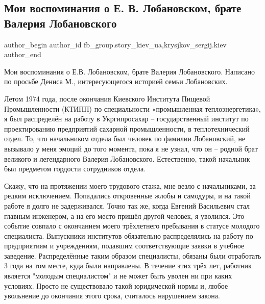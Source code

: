  
 
 
 
 
 
\subsection{Мои воспоминания о Е. В. Лобановском, брате Валерия Лобановского}
\label{sec:03_01_2022.fb.fb_group.story_kiev_ua.1.ev_lobanovskij}
 
\ifcmt
 author_begin
   author_id fb_group.story_kiev_ua,krysjkov_sergij.kiev
 author_end
\fi

Мои воспоминания о Е.В. Лобановском, брате Валерия Лобановского. Написано по
просьбе Дениса М., интересующегося историей семьи Лобановских.

Летом 1974 года, после окончания Киевского Института Пищевой Промышленности
(КТИПП) по специальности «промышленная теплоэнергетика», я был распределён на
работу в Укргипросахар – государственный институт по проектированию предприятий
сахарной промышленности, в теплотехнический отдел. То, что начальником отдела
был человек по фамилии Лобановский, не вызывало у меня эмоций до того момента,
пока я не узнал, что он – родной брат великого и легендарного Валерия
Лобановского. Естественно, такой начальник был предметом гордости сотрудников
отдела.


Скажу, что на протяжении моего трудового стажа, мне везло с начальниками, за
редким исключением. Попадались откровенные жлобы и самодуры, и на такой работе
я долго не задерживался. Точно так же, когда Евгений Васильевич стал главным
инженером, а на его место пришёл другой человек, я уволился. Это событие
совпало с окончанием моего трёхлетнего пребывания в статусе молодого
специалиста. Выпускники институтов обязательно распределялись на работу по
предприятиям и учреждениям, подавшим соответствующие заявки в учебное
заведение. Распределённые таким образом специалисты, обязаны были отработать 3
года на том месте, куда были направлены. В течение этих трёх лет, работник
является "молодым специалистом" и не может быть уволен ни при каких условиях.
Просто не существовало такой юридической нормы и, любое увольнение до окончания
этого срока, считалось нарушением закона.

